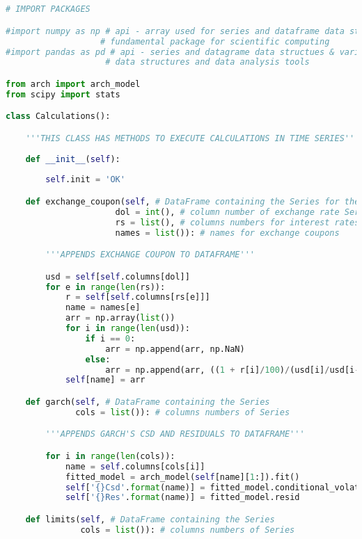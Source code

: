 \begin{lstlisting}[language=Python]


# IMPORT PACKAGES

#import numpy as np # api - array used for series and dataframe data structures
                   # fundamental package for scientific computing
#import pandas as pd # api - series and datagrame data structues & various 
                    # data structures and data analysis tools

from arch import arch_model
from scipy import stats

class Calculations():

    '''THIS CLASS HAS METHODS TO EXECUTE CALCULATIONS IN TIME SERIES'''
    
    def __init__(self):
        
        self.init = 'OK'

    def exchange_coupon(self, # DataFrame containing the Series for the exchange coupon
                      dol = int(), # column number of exchange rate Series
                      rs = list(), # columns numbers for interest rates Series (min 1 number, if > 1 then more than one measure of exchange coupon is generated)
                      names = list()): # names for exchange coupons

        '''APPENDS EXCHANGE COUPON TO DATAFRAME'''

        usd = self[self.columns[dol]]
        for e in range(len(rs)):
            r = self[self.columns[rs[e]]]
            name = names[e]
            arr = np.array(list())
            for i in range(len(usd)):
                if i == 0:
                    arr = np.append(arr, np.NaN)
                else:
                    arr = np.append(arr, ((1 + r[i]/100)/(usd[i]/usd[i-1])-1))
            self[name] = arr

    def garch(self, # DataFrame containing the Series 
              cols = list()): # columns numbers of Series

        '''APPENDS GARCH'S CSD AND RESIDUALS TO DATAFRAME'''

        for i in range(len(cols)):
            name = self.columns[cols[i]]
            fitted_model = arch_model(self[name][1:]).fit()
            self['{}Csd'.format(name)] = fitted_model.conditional_volatility
            self['{}Res'.format(name)] = fitted_model.resid

    def limits(self, # DataFrame containing the Series
               cols = list()): # columns numbers of Series


\end{lstlisting}
